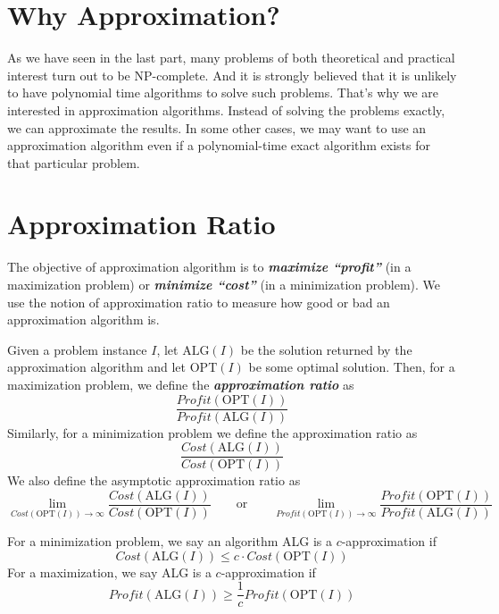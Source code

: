 \section{Why Approximation?}

As we have seen in the last part, many problems of both theoretical and practical interest turn out to be NP-complete. And it is strongly believed that it is unlikely to have polynomial time algorithms to solve such problems. That's why we are interested in approximation algorithms. Instead of solving the problems exactly, we can approximate the results. In some other cases, we may want to use an approximation algorithm even if a polynomial-time exact algorithm exists for that particular problem.

\section{Approximation Ratio}

The objective of approximation algorithm is to \textit{\textbf{maximize ``profit''}} (in a maximization problem) or \textit{\textbf{minimize ``cost''}} (in a minimization problem). We use the notion of approximation ratio to measure how good or bad an approximation algorithm is.

\begin{definition} 
    Given a problem instance $I$, let $\mathrm{ALG}(I)$ be the solution returned by the approximation algorithm and let $\mathrm{OPT}(I)$ be some optimal solution. Then, for a maximization problem, we define the \textit{\textbf{approximation ratio}} as
    $$
    \frac{\mathit{Profit}(\mathrm{OPT}(I))}{\mathit{Profit}(\mathrm{ALG}(I))}
    $$
    Similarly, for a minimization problem we define the approximation ratio as
    $$
    \frac{\mathit{Cost}(\mathrm{ALG}(I))}{\mathit{Cost}(\mathrm{OPT}(I))}
    $$
    We also define the asymptotic approximation ratio as
    $$
    \lim_{\mathit{Cost}(\mathrm{OPT}(I)) \to \infty}\frac{\mathit{Cost}(\mathrm{ALG}(I))}{\mathit{Cost}(\mathrm{OPT}(I))} \qquad \text{or} \qquad \lim_{\mathit{Profit}(\mathrm{OPT}(I)) \to \infty} \frac{\mathit{Profit}(\mathrm{OPT}(I))}{\mathit{Profit}(\mathrm{ALG}(I))}
    $$
\end{definition}

\begin{definition}[c-Approximation]
    For a minimization problem, we say an algorithm ALG is a $c$-approximation if
    $$
    \mathit{Cost}(\mathrm{ALG}(I)) \leq c \cdot \mathit{Cost}(\mathrm{OPT}(I))
    $$
    For a maximization, we say ALG is a $c$-approximation if
    $$
    \mathit{Profit}(\mathrm{ALG}(I)) \geq \frac{1}{c} \mathit{Profit}(\mathrm{OPT}(I))
    $$
\end{definition}

